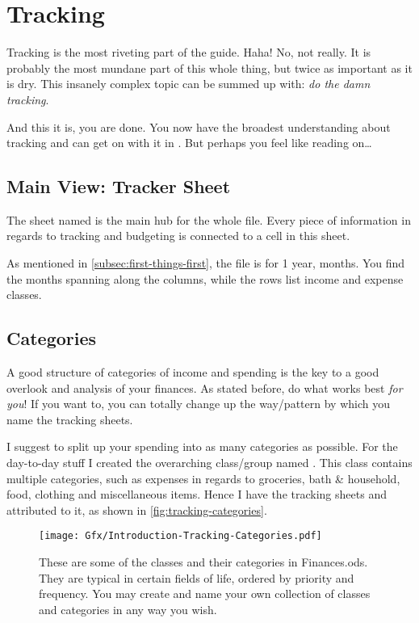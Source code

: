 \section{Tracking}
\label{sec:tracking}

Tracking is the most riveting part of the guide.
Haha!
No, not really.
It is probably the most mundane part of this whole thing, but twice as important as it is dry.
This insanely complex topic can be summed up with: \emph{do the damn tracking}.

And this it is, you are done.
You now have the broadest understanding about tracking and can get on with it in \tfn.
But perhaps you feel like reading on\ldots

\subsection{Main View: Tracker Sheet}
\label{subsec:main-tracker-sheet}

The sheet named  is the main hub for the whole file.
Every piece of information in regards to tracking and budgeting is connected to a cell in this sheet.

As mentioned in \autoref{subsec:first-things-first}, the file is for 1 year,  months.
You find the months spanning along the columns, while the rows list income and expense classes.

\subsection{Categories}
\label{subsec:tracking-categories}

A good structure of categories of income and spending is the key to a good overlook and analysis of your finances.
As stated before, do what works best \emph{for you}!
If you want to, you can totally change up the way/pattern by which you name the tracking sheets.

I suggest to split up your spending into as many categories as possible.
For the day-to-day stuff I created the overarching class/group named .
This class contains multiple categories, such as expenses in regards to groceries, bath \& household, food, clothing and miscellaneous items.
Hence I have the tracking sheets  and  attributed to it, as shown in \autoref{fig:tracking-categories}.

\begin{figure}[htp]
	\centering
	\texttt{[image: Gfx/Introduction-Tracking-Categories.pdf]}
	\caption[Tracking Categories]{These are some of the classes and their categories in Finances.ods.
	They are typical in certain fields of life, ordered by priority and frequency.
	You may create and name your own collection of classes and categories in any way you wish.%
	}
	\label{fig:tracking-categories}
\end{figure}

